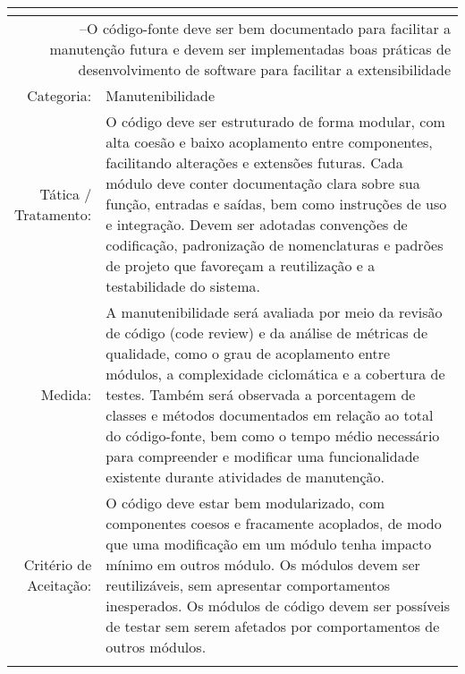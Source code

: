 \begin{footnotesize}
\begin{longtable}{|r|p{13cm}|}
		\multicolumn{2}{c}{}
		\\\hline

		\multicolumn{2}{|p{\dimexpr\linewidth-2\tabcolsep-2\arrayrulewidth}|}{\cellcolor{lightgray}\RNF\label{RNF-06} --O código-fonte deve ser bem documentado para facilitar a manutenção futura e devem ser implementadas boas práticas de desenvolvimento de software para facilitar a extensibilidade }
		\\\hline

		Categoria: & Manutenibilidade
		\\\hline

		\parbox[t]{2cm}{\raggedleft Tática /
		\\Tratamento:} &  O código deve ser estruturado de forma modular, com alta coesão e baixo acoplamento entre componentes, facilitando alterações e extensões futuras. Cada módulo deve conter documentação clara sobre sua função, entradas e saídas, bem como instruções de uso e integração. Devem ser adotadas convenções de codificação, padronização de nomenclaturas e padrões de projeto que favoreçam a reutilização e a testabilidade do sistema.\\\hline

		Medida:    & A manutenibilidade será avaliada por meio da revisão de código (code review) e da análise de métricas de qualidade, como o grau de acoplamento entre módulos, a complexidade ciclomática e a cobertura de testes. Também será observada a porcentagem de classes e métodos documentados em relação ao total do código-fonte, bem como o tempo médio necessário para compreender e modificar uma funcionalidade existente durante atividades de manutenção. \\\hline

		\parbox[t]{2cm}{\raggedleft Critério de
		\\Aceitação:} & O código deve estar bem modularizado, com componentes coesos e fracamente acoplados, de modo que uma modificação em um módulo tenha impacto mínimo em outros módulo. Os módulos devem ser reutilizáveis, sem apresentar comportamentos inesperados. Os módulos de código devem ser possíveis de testar sem serem afetados por comportamentos de outros módulos.\\\hline

		\\\hline
	\end{longtable}
\end{footnotesize}
